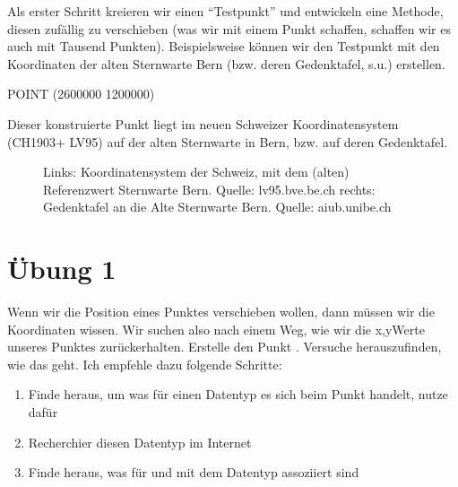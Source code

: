 \documentclass[letterpaper,10pt,english]{sphinxmanual}
\begin{document}
Als erster Schritt kreieren wir einen “Testpunkt” und entwickeln eine Methode, diesen zufällig zu verschieben (was wir mit einem Punkt schaffen, schaffen wir es auch mit Tausend Punkten). Beispielsweise können wir den Testpunkt mit den Koordinaten der alten Sternwarte Bern (bzw. deren Gedenktafel, s.u.) erstellen.

\begin{sphinxVerbatim}[commandchars=\\\{\}]
  
\end{sphinxVerbatim}

\begin{sphinxVerbatim}[commandchars=\\\{\}]
POINT (2600000 1200000)
\end{sphinxVerbatim}

Dieser konstruierte Punkt liegt im neuen Schweizer Koordinatensystem (CH1903+ LV95) auf der alten Sternwarte in Bern, bzw. auf deren Gedenktafel.

\begin{figure}[htbp]
\centering
\capstart

\noindent{}
\caption{Links: Koordinatensystem der Schweiz, mit dem (alten) Referenzwert Sternwarte Bern. Quelle: lv95.bve.be.ch
rechts: Gedenktafel an die Alte Sternwarte Bern. Quelle: aiub.unibe.ch}\label{\detokenize{02_04_Einzelpunkt_Verschieben:id1}}\end{figure}


\section{Übung 1}
\label{\detokenize{02_04_Einzelpunkt_Verschieben:ubung-1}}
Wenn wir die Position eines Punktes verschieben wollen, dann müssen wir die Koordinaten wissen. Wir suchen also nach einem Weg, wie wir die x,y\sphinxhyphen{}Werte unseres Punktes  zurückerhalten. Erstelle den Punkt . Versuche herauszufinden, wie das geht. Ich empfehle dazu folgende Schritte:
\begin{enumerate}
%
\item {} 
Finde heraus, um was für einen Datentyp es sich beim Punkt handelt, nutze dafür 

\item {} 
Recherchier diesen Datentyp im Internet

\item {} 
Finde heraus, was für  und  mit dem Datentyp assoziiert sind

\end{enumerate}
\end{document}
